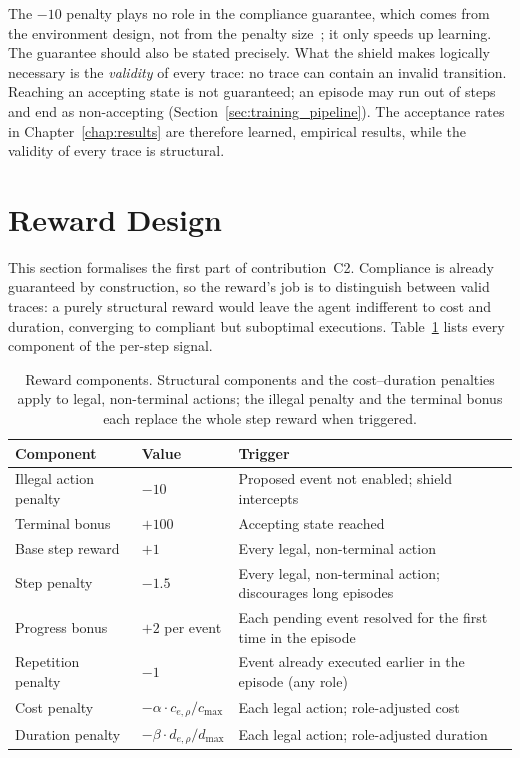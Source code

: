The $-10$ penalty plays no role in the compliance guarantee, which
comes from the environment design, not from the penalty
size~\cite{Odriozola-Olalde2025TowardsFramework}; it only speeds up
learning. The guarantee should also be stated precisely. What the
shield makes logically necessary is the \emph{validity} of every
trace: no trace can contain an invalid transition. Reaching an
accepting state is not guaranteed; an episode may run out of steps
and end as non-accepting (Section~\ref{sec:training_pipeline}). The
acceptance rates in Chapter~\ref{chap:results} are therefore learned,
empirical results, while the validity of every trace is structural.

\section{Reward Design}
\label{sec:reward}

This section formalises the first part of contribution~C2.
Compliance is already guaranteed by construction, so the reward's job
is to distinguish between valid traces: a purely structural reward
would leave the agent indifferent to cost and duration, converging to
compliant but suboptimal executions.
Table~\ref{tab:reward_components} lists every component of the
per-step signal.

\begin{table}[H]
\centering
\caption{Reward components. Structural components and the
cost--duration penalties apply to legal, non-terminal actions; the
illegal penalty and the terminal bonus each replace the whole step
reward when triggered.}
\label{tab:reward_components}
{\renewcommand{\arraystretch}{1.5}
\setlength{\tabcolsep}{14pt}
\begin{tabular}{l l p{4.6cm}}
\toprule
\textbf{Component} & \textbf{Value} & \textbf{Trigger} \\
\midrule
Illegal action penalty & $-10$ &
  Proposed event not enabled; shield intercepts \\
Terminal bonus & $+100$ &
  Accepting state reached \\
Base step reward & $+1$ &
  Every legal, non-terminal action \\
Step penalty & $-1.5$ &
  Every legal, non-terminal action; discourages long episodes \\
Progress bonus & $+2$ per event &
  Each pending event resolved for the first time in the episode \\
Repetition penalty & $-1$ &
  Event already executed earlier in the episode (any role) \\
Cost penalty & $-\alpha \cdot c_{e,\rho} / c_{\max}$ &
  Each legal action; role-adjusted cost \\
Duration penalty & $-\beta \cdot d_{e,\rho} / d_{\max}$ &
  Each legal action; role-adjusted duration \\
\bottomrule
\end{tabular}}
\end{table}


